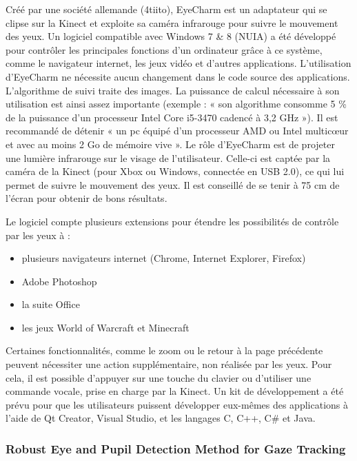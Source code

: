Créé par une société allemande (4tiito), EyeCharm \cite{eyecharm} est un adaptateur qui se clipse sur la Kinect et exploite sa caméra infrarouge pour suivre le mouvement des yeux. Un logiciel compatible avec Windows 7 \& 8 (NUIA) a été développé pour contrôler les principales fonctions d’un ordinateur grâce à ce système, comme le navigateur internet, les jeux vidéo et d’autres applications. L’utilisation d’EyeCharm ne nécessite aucun changement dans le code source des applications.
L’algorithme de suivi traite des images. La puissance de calcul nécessaire à son utilisation est ainsi assez importante (exemple : « son algorithme consomme 5 \% de la puissance d’un processeur Intel Core i5-3470 cadencé à 3,2 GHz »). Il est recommandé de détenir « un pc équipé d’un processeur AMD ou Intel multicœur et avec au moins 2 Go de mémoire vive ».
Le rôle d’EyeCharm est de projeter une lumière infrarouge sur le visage de l’utilisateur. Celle-ci est captée par la caméra de la Kinect (pour Xbox ou Windows, connectée en USB 2.0), ce qui lui permet de suivre le mouvement des yeux. Il est conseillé de se tenir à 75 cm de l’écran pour obtenir de bons résultats.

Le logiciel compte plusieurs extensions pour étendre les possibilités de contrôle par les yeux à :
\begin{itemize}[label=\textbullet,font=\color{black}]
\item plusieurs navigateurs internet (Chrome, Internet Explorer, Firefox)
\item Adobe Photoshop
\item la suite Office
\item les jeux World of Warcraft et Minecraft
\end{itemize}

Certaines fonctionnalités, comme le zoom ou le retour à la page précédente peuvent nécessiter une action supplémentaire, non réalisée par les yeux. Pour cela, il est possible d’appuyer sur une touche du clavier ou d’utiliser une commande vocale, prise en charge par la Kinect. 
Un kit de développement a été prévu pour que les utilisateurs puissent développer eux-mêmes des applications à l’aide de Qt Creator, Visual Studio, et les langages C, C++, C\# et Java.

\subsubsection{Robust Eye and Pupil Detection Method for Gaze Tracking \cite{gwon2013robust}}
\label{SystSC}

